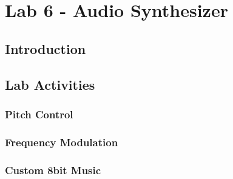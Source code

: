 \section{Lab 6 - Audio Synthesizer}

\subsection{Introduction}

\subsection{Lab Activities}

\subsubsection{Pitch Control}


\subsubsection{Frequency Modulation}

\subsubsection{Custom 8bit Music}
